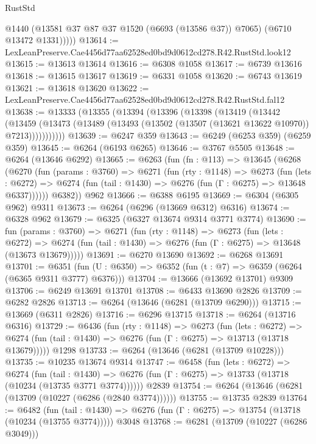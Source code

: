 \begin{lexlean}{RustStd}
\begin{coremodule}
            @1440
            (@13581 @37 @87 @37 @1520 (@6693 (@13586 @37)) @7065)
            (@6710 @13472 @1331)))))
@13614 := LexLeanPreserve.Cae4456d77aa62528ed0bd9d0612cd278.R42.RustStd.look12
@13615 := @13613 @13614
@13616 := @6308 @1058
@13617 := @6739 @13616
@13618 := @13615 @13617
@13619 := @6331 @1058
@13620 := @6743 @13619
@13621 := @13618 @13620
@13622 := LexLeanPreserve.Cae4456d77aa62528ed0bd9d0612cd278.R42.RustStd.fal12
@13638 := @13333
    (@13355
      (@13394
        (@13396
          (@13398
            (@13419
              (@13442
                (@13459
                  (@13473 (@13489 (@13493 (@13502 (@13507 (@13621 @13622 @10970)) @7213)))))))))))
@13639 := @6247 @359
@13643 := @6249 (@6253 @359) (@6259 @359)
@13645 := @6264 (@6193 @6265)
@13646 := @3767 @5505
@13648 := @6264 (@13646 @6292)
@13665 := @6263
    (fun (fn : @113) =>
    @13645
      (@6268
        (@6270
          (fun (params : @3760) =>
          @6271
            (fun (rty : @1148) =>
            @6273
              (fun (lets : @6272) =>
              @6274 (fun (tail : @1430) => @6276 (fun (Γ : @6275) => @13648 @6337))))))
        @6382))
    @962
@13666 := @6388 @6195
@13669 := @6304 (@6305 @962) @9311
@13673 := @6264 (@6296 (@13669 @6312) @6316)
@13674 := @6328 @962
@13679 := @6325 (@6327 @13674 @9314 @3771 @3774)
@13690 := fun (params : @3760) =>
  @6271
    (fun (rty : @1148) =>
    @6273
      (fun (lets : @6272) =>
      @6274 (fun (tail : @1430) => @6276 (fun (Γ : @6275) => @13648 (@13673 @13679)))))
@13691 := @6270 @13690
@13692 := @6268 @13691
@13701 := @6351 (fun (U : @6350) => @6352 (fun (t : @7) => @6359 (@6264 (@6365 @9311 @3777) @6376)))
@13704 := @13666 (@13692 @13701) @9309
@13706 := @6249 @13691 @13701
@13708 := @6433 @13690 @2826
@13709 := @6282 @2826
@13713 := @6264 (@13646 (@6281 (@13709 @6290)))
@13715 := @13669 (@6311 @2826)
@13716 := @6296 @13715
@13718 := @6264 (@13716 @6316)
@13729 := @6436
    (fun (rty : @1148) =>
    @6273
      (fun (lets : @6272) =>
      @6274 (fun (tail : @1430) => @6276 (fun (Γ : @6275) => @13713 (@13718 @13679)))))
    @1298
@13733 := @6264 (@13646 (@6281 (@13709 @10228)))
@13735 := @10235 @13674 @9314
@13747 := @6458
    (fun (lets : @6272) =>
    @6274
      (fun (tail : @1430) =>
      @6276 (fun (Γ : @6275) => @13733 (@13718 (@10234 (@13735 @3771 @3774))))))
    @2839
@13754 := @6264 (@13646 (@6281 (@13709 (@10227 (@6286 (@2840 @3774))))))
@13755 := @13735 @2839
@13764 := @6482
    (fun (tail : @1430) => @6276 (fun (Γ : @6275) => @13754 (@13718 (@10234 (@13755 @3774)))))
    @3048
@13768 := @6281 (@13709 (@10227 (@6286 @3049)))

\end{coremodule}
\end{lexlean}
